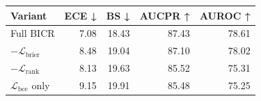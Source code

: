 \begin{tabular}{lrrrr}
\toprule
Variant & ECE ↓ & BS ↓ & AUCPR ↑ & AUROC ↑ \\
\midrule
Full BICR & 7.08 & 18.43 & 87.43 & 78.61 \\
$-\mathcal{L}_{\mathrm{brier}}$ & 8.48 & 19.04 & 87.10 & 78.02 \\
$-\mathcal{L}_{\mathrm{rank}}$ & 8.13 & 19.63 & 85.52 & 75.31 \\
$\mathcal{L}_{\mathrm{bce}}$ only & 9.15 & 19.91 & 85.48 & 75.25 \\
\bottomrule
\end{tabular}
